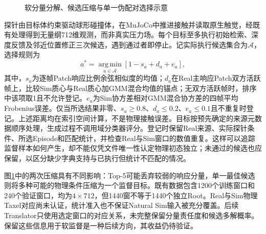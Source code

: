 \begin{figure}[htbp]
 \centering
 \caption{软分量分解、候选压缩与单一伪配对选择示意}
 \label{fig:ch05_gmm_candidate_selection}
\end{figure}

探针由目标体约束驱动球形碰撞体，在MuJoCo中推进接触并读取原生触觉，经既有处理得到无量纲712维观测，而非真实压力场。每个目标至多执行初始检索、深度反馈及邻近位置修正三次候选，遇到通过者即停止。记实际执行候选集合为$\mathcal A$，选择规则为
\begin{equation}
 a^*=\operatorname*{arg\,min}_{a\in\mathcal A}
 \left[1-s_a+d_a+e_a\right],
 \label{eq:ch05_pair_selection}
\end{equation}
其中，$s_a$为逐帧Patch响应比例余弦相似度的均值；$d_a$在Real主响应Patch双方活跃帧上，比较Sim质心与Real质心加GMM混合均值的锚点；无双方活跃帧时，排序中该项取1且不允许登记。$e_a$为Sim协方差相对GMM混合协方差的四帧平均Frobenius误差。仅当所选结果非零、$s_a\ge0.8$、$d_a\le0.2$、$e_a\le0.1$且不重复时登记。上述距离均在索引空间计算，不是物理接触误差。目标按预先确定的来源元数据顺序处理，生成过程不调用域分类器评分。登记时保留Real来源、实际探针条件、所选Episode和匹配统计，并检查Real与Sim窗口的数值重复。这样可以追踪监督样本如何产生，却不能仅凭文件唯一性认定物理初态独立；未通过的候选也应保留，以区分缺少字典支持与已执行但统计不匹配的情况。

图\ref{fig:ch05_gmm_candidate_selection}中的两次压缩具有不同影响：Top-5可能丢弃较弱的响应分量，单一最佳候选则将多种可能的物理条件压缩为一个监督目标。既有数据包含1200个训练窗口和240个验证窗口，均为$4\times712$，但1440窗不等于1440个独立Root。Real与Sim物理Taxel对应尚未认证，统计准入也不保证Natural Sim输入被充分覆盖。后续Translator只使用选定窗口的对应关系，未完整保留分量责任度和候选多解概率。保留这些信息用于软监督是一种后续方向，其收益仍待验证。
